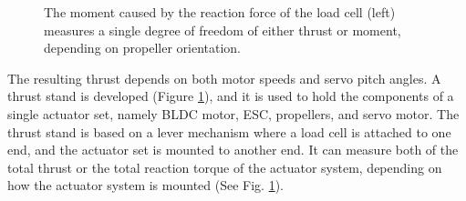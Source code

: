 \documentclass[twocolumn,letterpaper]{IEEEAerospaceCLS}  %
\begin{document}
\begin{figure}
\centerline{
	\hfill
	}
\caption{The moment caused by the reaction force of the load cell (left) measures a single degree of freedom of either thrust or moment, depending on propeller orientation.}
\label{TestStand}
\end{figure}

The resulting thrust depends on both motor speeds and servo pitch angles. A thrust stand is developed (Figure \ref{TestStand}), and it is used to hold the components of a single actuator set, namely BLDC motor, ESC, propellers, and servo motor. The thrust stand is based on a lever mechanism where a load cell is attached to one end, and the actuator set is mounted to another end. It can measure both of the total thrust or the total reaction torque of the actuator system, depending on how the actuator system is mounted (See Fig. \ref{TestStand}). 
\end{document}

